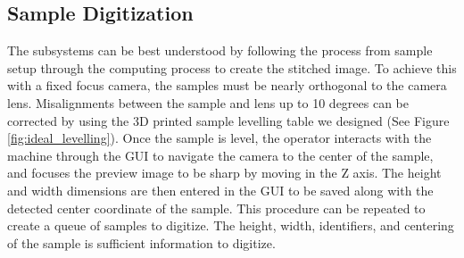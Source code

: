 \documentclass[a4paper,12pt]{article}
\begin{document}
\subsection{Sample Digitization} %
The subsystems can be best understood by following the process from sample setup through the computing process to create the stitched image. 
To achieve this with a fixed focus camera, the samples must be nearly orthogonal to the camera lens. Misalignments between the sample and lens up to 10 degrees can be corrected by using the 3D printed sample levelling table we designed (See Figure \ref{fig:ideal_levelling}).
Once the sample is level, the operator interacts with the machine through the GUI to navigate the camera to the center of the sample, and focuses the preview image to be sharp by moving in the Z axis. The height and width dimensions are then entered in the GUI
to be saved along with the detected center coordinate of the sample. This procedure can be repeated to create a queue of samples to digitize.
The height, width, identifiers, and centering of the sample is sufficient information to digitize.
\end{document}
